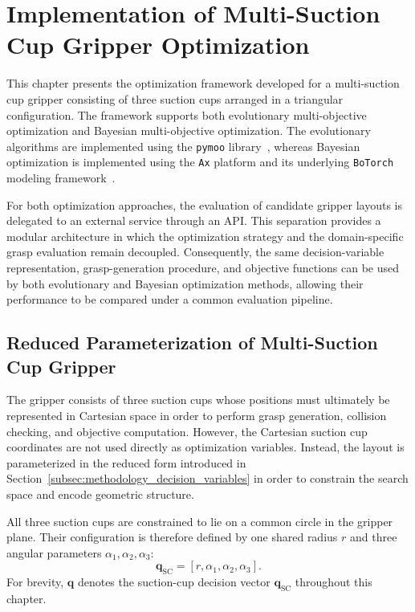 \section{Implementation of Multi-Suction Cup Gripper Optimization}

This chapter presents the optimization framework developed for a multi-suction cup gripper
consisting of three suction cups arranged in a triangular configuration. The framework supports both
evolutionary multi-objective optimization and Bayesian multi-objective optimization. The
evolutionary algorithms are implemented using the \texttt{pymoo} library~\cite{pymoo}, whereas
Bayesian optimization is implemented using the \texttt{Ax} platform and its underlying
\texttt{BoTorch} modeling framework~\cite{olson2025ax,botorch}.

For both optimization approaches, the evaluation of candidate gripper layouts is delegated to an
external service through an API. This separation provides a modular architecture in which the
optimization strategy and the domain-specific grasp evaluation remain decoupled. Consequently, the
same decision-variable representation, grasp-generation procedure, and objective functions can be
used by both evolutionary and Bayesian optimization methods, allowing their performance to be
compared under a common evaluation pipeline.

\subsection{Reduced Parameterization of Multi-Suction Cup Gripper}

The gripper consists of three suction cups whose positions must ultimately be represented in
Cartesian space in order to perform grasp generation, collision checking, and objective computation.
However, the Cartesian suction cup coordinates are not used directly as optimization variables.
Instead, the layout is parameterized in the reduced form introduced in
Section~\ref{subsec:methodology_decision_variables} in order to constrain the search space and
encode geometric structure.

All three suction cups are constrained to lie on a common circle in the gripper plane. Their
configuration is therefore defined by one shared radius $r$ and three angular parameters
$\alpha_1,\alpha_2,\alpha_3$:
\begin{equation}
    \mathbf{q}_{\mathrm{SC}} = [r,\alpha_1,\alpha_2,\alpha_3].
\end{equation}
For brevity, $\mathbf{q}$ denotes the suction-cup decision vector $\mathbf{q}_{\mathrm{SC}}$
throughout this chapter.

